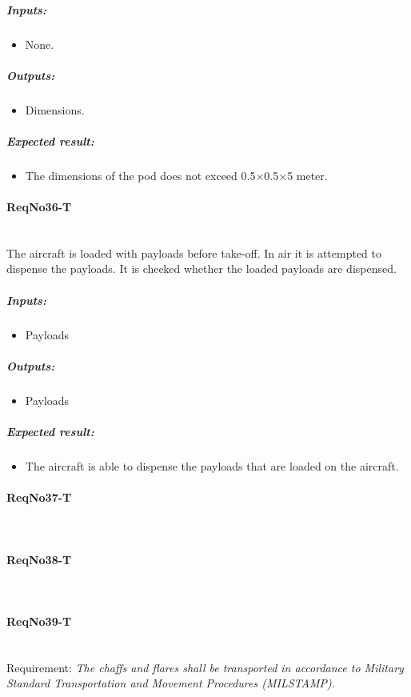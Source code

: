 	\subparagraph{Inputs:}
	\begin{itemize}
	\item None.
	\end{itemize}
	\subparagraph{Outputs:}
	\begin{itemize}
	\item Dimensions.
	\end{itemize}
	\subparagraph{Expected result:}
	\begin{itemize}
	\item The dimensions of the pod does not exceed 0.5$\times$0.5$\times$5 meter.
	\end{itemize}


\paragraph{ReqNo36-T}\mbox{}\\ %
The aircraft is loaded with payloads before take-off. In air it is attempted to dispense the payloads. It is checked whether the loaded payloads are dispensed.
\\
	\subparagraph{Inputs:}
	\begin{itemize}
	\item Payloads
	\end{itemize}
	\subparagraph{Outputs:}
	\begin{itemize}
	\item Payloads
	\end{itemize}
	\subparagraph{Expected result:}
	\begin{itemize}
	\item The aircraft is able to dispense the payloads that are loaded on the aircraft.
	\end{itemize}


\paragraph{ReqNo37-T}\mbox{}\\ %


\paragraph{ReqNo38-T}\mbox{}\\ %

\paragraph{ReqNo39-T}\mbox{}\\ %
Requirement: \textit{The chaffs and flares shall be transported in accordance to Military Standard Transportation and Movement Procedures (MILSTAMP).}\\


